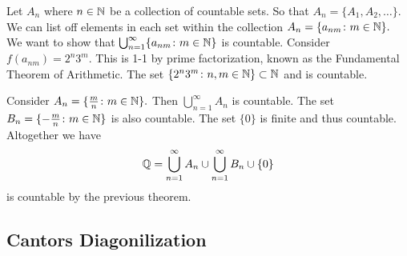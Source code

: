 \documentclass{report}
\begin{document}
  \begin{myproof}
    Let $A_n$ where $n \in \NN$ be a collection of countable sets. So that  $A_n = \{A_1, A_2, \dots \}.$ We can list off elements in each set within the collection $A_n = \{a_{nm} \colon m \in \NN\}.$ We want to show that $\bigcup_{n=1}^{\infty}\{a_{nm} \colon m \in \NN\}$ is countable. Consider $f(a_{nm}) = 2^n3^m.$ This is 1-1 by prime factorization, known as the Fundamental Theorem of Arithmetic. The set $\{2^n3^m \colon n,m \in \NN \} \subset \NN$ and is countable.
  \end{myproof}


  \begin{myproof}
    Consider $A_n = \{ \frac{m}{n} \colon m \in \NN \}.$ Then $
    \bigcup_{n=1}^{\infty} A_n$ is countable. The set $B_n = \{ -\frac{m}{n} \colon m \in \NN \}$ is also countable. The set $\{0\}$ is finite and thus countable. Altogether we have $$ \QQ = \bigcup_{n=1}^{\infty} A_n \cup \bigcup_{n=1}^{\infty} B_n \cup \{0\}$$ is countable by the previous theorem.
  \end{myproof}

  \subsection{Cantors Diagonilization}


  
\end{document}
